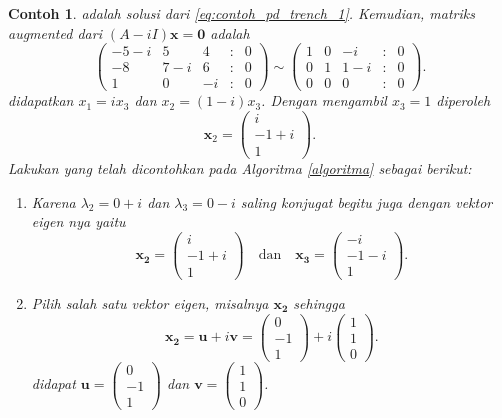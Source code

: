 \documentclass[a4paper]{article}
\theoremstyle{definisi}
\newtheorem{contoh}{Contoh}[subsection]
\numberwithin{equation}{section}
\begin{document}
\begin{contoh}
    adalah solusi dari \eqref{eq:contoh_pd_trench_1}. 
    Kemudian, matriks \textit{augmented} dari $(A-iI)\mathbf{x} = \mathbf{0}$ adalah
    \begin{equation*}
      \begin{pmatrix}
        -5-i & 5 & 4 &:& 0\\
        -8 & 7-i & 6 &:& 0\\
        1 & 0 & -i &:& 0
      \end{pmatrix} \sim \begin{pmatrix}
        1 & 0 & -i &:& 0\\
        0 & 1 & 1-i & :&0\\
        0 & 0 & 0 & :&0
      \end{pmatrix}.
    \end{equation*}
    didapatkan $x_1 = ix_3$ dan $x_2 = (1-i)x_3$. Dengan mengambil $x_3 = 1$ diperoleh
    \[\mathbf{x}_2 = \begin{pmatrix}i\\-1+i\\1\end{pmatrix}.\]
    Lakukan yang telah dicontohkan pada Algoritma \ref{algoritma} sebagai berikut:
    \begin{enumerate}[label=Langkah \arabic*: ,leftmargin=*]
      \item Karena $\lambda_2=0+i$ dan $\lambda_3=0-i$ saling konjugat begitu juga dengan vektor eigen nya yaitu
      \[\mathbf{x_2}= \begin{pmatrix}i\\-1+i\\1\end{pmatrix} \quad \text{dan} \quad \mathbf{x_3}= \begin{pmatrix}-i\\-1-i\\1\end{pmatrix}.\]
      \item Pilih salah satu vektor eigen, misalnya $\mathbf{x_2}$ sehingga 
      \[\mathbf{x_2} = \mathbf{u}+i\mathbf{v}= \begin{pmatrix}0\\-1\\1\end{pmatrix} + i\begin{pmatrix}1\\1\\0\end{pmatrix}.\]
      didapat $\mathbf{u} = \begin{pmatrix}0\\-1\\1\end{pmatrix}$ dan $\mathbf{v} = \begin{pmatrix}1\\1\\0\end{pmatrix}$.

\end{enumerate}
\end{contoh}
\end{document}
